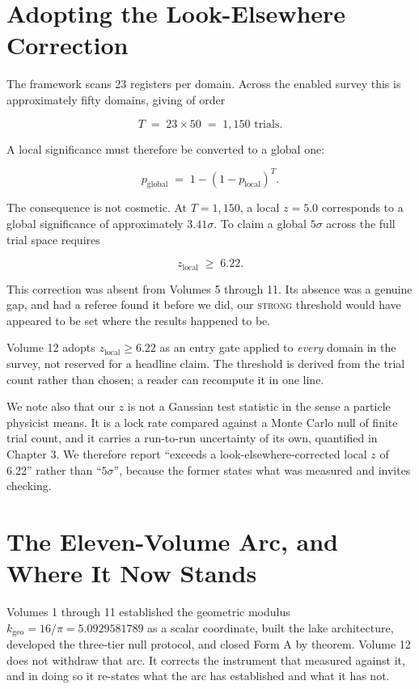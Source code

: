 \documentclass[11pt, letterpaper, openany]{book}
\newcommand{\kgeo}{k_{\mathrm{geo}}}
\begin{document}
\section{Adopting the Look-Elsewhere Correction}

The framework scans 23 registers per domain. Across the enabled survey this is approximately
fifty domains, giving of order

\[
T \;=\; 23 \times 50 \;=\; 1{,}150 \text{ trials.}
\]

A local significance must therefore be converted to a global one:

\[
p_{\text{global}} \;=\; 1 - \left(1 - p_{\text{local}}\right)^{T}.
\]

\noindent The consequence is not cosmetic. At $T = 1{,}150$, a local $z = 5.0$ corresponds to a
global significance of approximately $3.41\sigma$. To claim a global $5\sigma$ across the full
trial space requires

\begin{equation}
z_{\text{local}} \;\geq\; 6.22 .
\end{equation}

\begin{warningbox}
This correction was absent from Volumes 5 through 11. Its absence was a genuine gap, and had a
referee found it before we did, our \textsc{strong} threshold would have appeared to be set
where the results happened to be.

\medskip
\noindent Volume 12 adopts $z_{\text{local}} \geq 6.22$ as an entry gate applied to
\emph{every} domain in the survey, not reserved for a headline claim. The threshold is derived
from the trial count rather than chosen; a reader can recompute it in one line.
\end{warningbox}

We note also that our $z$ is not a Gaussian test statistic in the sense a particle physicist
means. It is a lock rate compared against a Monte Carlo null of finite trial count, and it
carries a run-to-run uncertainty of its own, quantified in Chapter 3. We therefore report
``exceeds a look-elsewhere-corrected local $z$ of 6.22'' rather than ``$5\sigma$'', because the
former states what was measured and invites checking.

\section{The Eleven-Volume Arc, and Where It Now Stands}

Volumes 1 through 11 established the geometric modulus $\kgeo = 16/\pi = 5.0929581789$ as a
scalar coordinate, built the lake architecture, developed the three-tier null protocol, and
closed Form A by theorem. Volume 12 does not withdraw that arc. It corrects the instrument that
measured against it, and in doing so it re-states what the arc has established and what it has
not.
\end{document}

